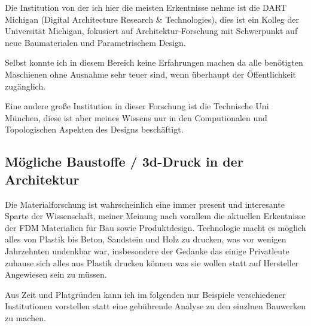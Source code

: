 \documentclass{article}
\begin{document}
Die Institution von der ich hier die meisten Erkentnisse nehme ist die DART Michigan
(Digital Architecture Research \& Technologies), dies ist ein Kolleg der
Universit\"at Michigan, fokusiert auf Architektur-Forschung mit Schwerpunkt auf 
neue Baumaterialen und Parametrischem Design.

Selbst konnte ich in diesem Bereich keine Erfahrungen machen da alle ben\"otigten Maschienen 
ohne Ausnahme sehr teuer sind, wenn \"uberhaupt der \"Offentlichkeit zug\"anglich.

Eine andere gro\ss{}e Institution in dieser Forschung ist die Technische Uni M\"unchen,
diese ist aber meines Wissens nur in den Computionalen und Topologischen Aspekten 
des Designs besch\"aftigt.


\subsection{M\"ogliche Baustoffe / 3d-Druck in der Architektur}
Die Materialforschung ist wahrscheinlich eine immer present und interesante
Sparte der Wissenschaft, meiner Meinung nach vorallem die aktuellen Erkentnisse
der FDM Materialien f\"ur Bau sowie Produktdesign. Technologie macht es
m\"oglich alles von Plastik bis Beton, Sandstein und Holz zu drucken, was vor
wenigen Jahrzehnten undenkbar war, insbesondere der Gedanke das einige
Privatleute zuhause sich alles aus Plastik drucken k\"onnen was sie wollen
statt auf Hersteller Angewiesen sein zu m\"ussen.

Aus Zeit und Platgr\"unden kann ich im folgenden nur Beispiele verschiedener
Institutionen vorstellen statt eine geb\"uhrende Analyse zu den einzlnen
Bauwerken zu machen.
\end{document}
